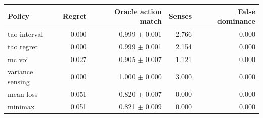 \begin{tabular}{lrrrr}
\toprule
Policy & Regret & Oracle action match & Senses & False dominance \\
\midrule
tao interval & 0.000 & 0.999 $\pm$ 0.001 & 2.766 & 0.000 \\
tao regret & 0.000 & 0.999 $\pm$ 0.001 & 2.154 & 0.000 \\
mc voi & 0.027 & 0.905 $\pm$ 0.007 & 1.121 & 0.000 \\
variance sensing & 0.000 & 1.000 $\pm$ 0.000 & 3.000 & 0.000 \\
mean loss & 0.051 & 0.820 $\pm$ 0.007 & 0.000 & 0.000 \\
minimax & 0.051 & 0.821 $\pm$ 0.009 & 0.000 & 0.000 \\
\bottomrule
\end{tabular}
